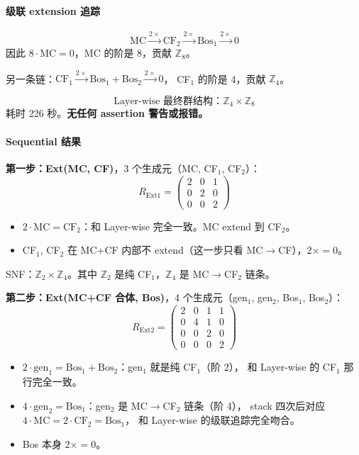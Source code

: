 \documentclass[a4paper,fontset=ubuntu,12pt]{ctexart}
\begin{document}
\paragraph{级联 extension 追踪}
\begin{equation}
\mathrm{MC} \xrightarrow{2\times} \mathrm{CF}_2 \xrightarrow{2\times} \mathrm{Bos}_1 \xrightarrow{2\times} 0
\label{eq:cascade-sg6}
\end{equation}
因此 $8\cdot\mathrm{MC}=0$，MC 的阶是 8，贡献 $\mathbb{Z}_8$。

另一条链：$\mathrm{CF}_1 \xrightarrow{2\times} \mathrm{Bos}_1{+}\mathrm{Bos}_2 \xrightarrow{2\times} 0$，
CF$_1$ 的阶是 4，贡献 $\mathbb{Z}_4$。

\begin{equation}
\boxed{\text{Layer-wise 最终群结构：}\mathbb{Z}_4 \times \mathbb{Z}_8}
\end{equation}
耗时 226 秒。\textbf{无任何 assertion 警告或报错。}

\paragraph{Sequential 结果}

\textbf{第一步：Ext(MC, CF)}，3 个生成元（MC, CF$_1$, CF$_2$）：
\begin{equation}
R_{\mathrm{Ext1}} = \begin{pmatrix}
2 & 0 & 1 \\
0 & 2 & 0 \\
0 & 0 & 2
\end{pmatrix}
\label{eq:rmat-ext1-sg6}
\end{equation}
\begin{itemize}
\item $2\cdot\mathrm{MC} = \mathrm{CF}_2$：和 Layer-wise 完全一致。MC extend 到 CF$_2$。
\item CF$_1$, CF$_2$ 在 MC+CF 内部不 extend（这一步只看 MC$\to$CF），$2\times = 0$。
\end{itemize}
SNF：$\mathbb{Z}_2 \times \mathbb{Z}_4$。其中 $\mathbb{Z}_2$ 是纯 CF$_1$，$\mathbb{Z}_4$ 是 MC$\to$CF$_2$ 链条。

\textbf{第二步：Ext(MC+CF 合体, Bos)}，4 个生成元（gen$_1$, gen$_2$, Bos$_1$, Bos$_2$）：
\begin{equation}
R_{\mathrm{Ext2}} = \begin{pmatrix}
2 & 0 & 1 & 1 \\
0 & 4 & 1 & 0 \\
0 & 0 & 2 & 0 \\
0 & 0 & 0 & 2
\end{pmatrix}
\label{eq:rmat-ext2-sg6}
\end{equation}
\begin{itemize}
\item $2\cdot\mathrm{gen}_1 = \mathrm{Bos}_1 + \mathrm{Bos}_2$：gen$_1$ 就是纯 CF$_1$（阶 2），
  和 Layer-wise 的 CF$_1$ 那行完全一致。
\item $4\cdot\mathrm{gen}_2 = \mathrm{Bos}_1$：gen$_2$ 是 MC$\to$CF$_2$ 链条（阶 4），
  stack 四次后对应 $4\cdot\mathrm{MC} = 2\cdot\mathrm{CF}_2 = \mathrm{Bos}_1$，
  和 Layer-wise 的级联追踪完全吻合。
\item Bos 本身 $2\times = 0$。
\end{itemize}
\end{document}

